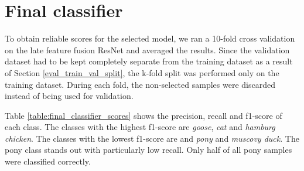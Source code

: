 \documentclass{l4proj}
\begin{document}



\section{Final classifier}

To obtain reliable scores for the selected model, we ran a 10-fold cross validation on the late feature fusion ResNet and averaged the results. Since the validation dataset had to be kept completely separate from the training dataset as a result of Section \ref{eval_train_val_split}, the k-fold split was performed only on the training dataset. During each fold, the non-selected samples were discarded instead of being used for validation.

Table \ref{table:final_classifier_scores} shows the precision, recall and f1-score of each class. The classes with the highest f1-score are \textit{goose}, \textit{cat} and \textit{hamburg chicken}. The classes with the lowest f1-score are and \textit{pony} and \textit{muscovy duck}. The pony class stands out with particularly low recall. Only half of all pony samples were classified correctly.
\end{document}
